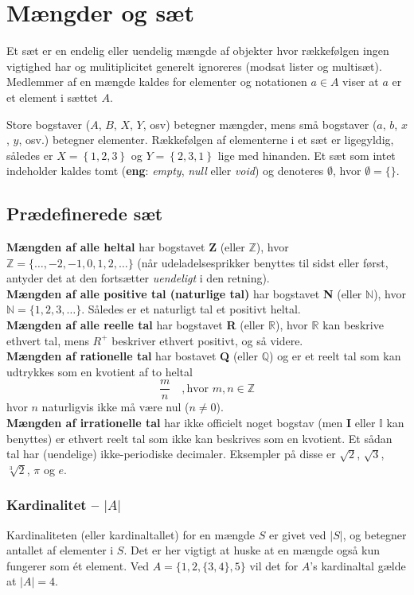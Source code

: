 \chapter{Mængder og sæt}
Et sæt er en endelig eller uendelig mængde af objekter hvor rækkefølgen ingen vigtighed har og mulitiplicitet generelt ignoreres (modsat lister og multisæt). Medlemmer af en mængde kaldes for elementer og notationen $a\in A$ viser at $a$ er et element i sættet $A$. 

Store bogstaver ($A$, $B$, $X$, $Y$, osv) betegner mængder, mens små bogstaver ($a$, $b$, $x$, $y$, osv.) betegner elementer. Rækkefølgen af elementerne i et sæt er ligegyldig, således er $X=\left\{ 1,2,3\right\}$ og $Y=\left\{ 2,3,1\right\}$ lige med hinanden. 
Et sæt som intet indeholder kaldes tomt (\textbf{eng}: \textit{empty}, \textit{null} eller \textit{void}) og denoteres $\emptyset$, hvor $\emptyset = \{\}$.
\section{Prædefinerede sæt}
\textbf{Mængden af alle heltal} har bogstavet \textbf{Z} (eller $\mathbb{Z}$), hvor $\mathbb{Z}=\{\ldots, -2, -1, 0, 1, 2, \ldots\}$ (når udeladelsesprikker benyttes til sidst eller først, antyder det at den fortsætter \emph{uendeligt} i den retning).\\
\textbf{Mængden af alle positive tal (naturlige tal)} har bogstavet \textbf{N} (eller $\mathbb{N}$), hvor $\mathbb{N}=\{1,2,3,\ldots\}$. Således er et naturligt tal et positivt heltal.\\
\textbf{Mængden af alle reelle tal} har bogstavet \textbf{R} (eller $\mathbb{R}$), hvor $\mathbb{R}$ kan beskrive ethvert tal, mens $R^+$ beskriver ethvert positivt, og så videre.\\
\textbf{Mængden af rationelle tal} har bostavet \textbf{Q} (eller $\mathbb{Q}$) og er et reelt tal som kan udtrykkes som en kvotient af to heltal\[\frac{m}{n}\quad, \text{hvor } m,n\in \mathbb{Z}\]hvor $n$ naturligvis ikke må være nul ($n\neq 0$).\\
\textbf{Mængden af irrationelle tal} har ikke officielt noget bogstav (men \textbf{I} eller $\mathbb{I}$ kan benyttes) er ethvert reelt tal som ikke kan beskrives som en kvotient. Et sådan tal har (uendelige) ikke-periodiske decimaler. Eksempler på disse er $\sqrt{2}$, $\sqrt{3}$, $\sqrt[3]{2}$, $\pi$ og $e$.
\subsection{Kardinalitet \texorpdfstring{-- $|A|$}{|A|}}
Kardinaliteten (eller kardinaltallet) for en mængde $S$ er givet ved $|S|$, og betegner antallet af elementer i $S$. Det er her vigtigt at huske at en mængde også kun fungerer som ét element. Ved $A=\{1,2,\{3,4\},5\}$ vil det for $A$'s kardinaltal gælde at $|A|=4$.
